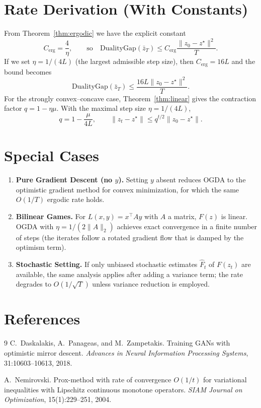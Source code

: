 \documentclass[11pt]{article}
\begin{document}
\section*{Rate Derivation (With Constants)}
From Theorem~\ref{thm:ergodic} we have the explicit constant
\[
C_{\text{erg}}=\frac{4}{\eta},
\qquad
\text{so}\quad
\text{DualityGap}(\bar z_T)\le C_{\text{erg}}\frac{\|z_0-z^{\star}\|^2}{T}.
\]
If we set $\eta=1/(4L)$ (the largest admissible step size), then $C_{\text{erg}}=16L$ and the bound becomes
\[
\text{DualityGap}(\bar z_T)\le \frac{16L\|z_0-z^{\star}\|^2}{T}.
\]
For the strongly convex–concave case, Theorem~\ref{thm:linear} gives the contraction factor $q=1-\eta\mu$. With the maximal step size $\eta=1/(4L)$,
\[
q=1-\frac{\mu}{4L},
\qquad
\|z_t-z^{\star}\|\le q^{t/2}\|z_0-z^{\star}\|.
\]

\section*{Special Cases}
\begin{enumerate}[label=(\alph*)]
\item \textbf{Pure Gradient Descent (no $y$).} Setting $y$ absent reduces OGDA to the optimistic gradient method for convex minimization, for which the same $O(1/T)$ ergodic rate holds.
\item \textbf{Bilinear Games.} For $L(x,y)=x^{\top}Ay$ with $A$ a matrix, $F(z)$ is linear. OGDA with $\eta=1/(2\|A\|_2)$ achieves exact convergence in a finite number of steps (the iterates follow a rotated gradient flow that is damped by the optimism term).
\item \textbf{Stochastic Setting.} If only unbiased stochastic estimates $\hat F_t$ of $F(z_t)$ are available, the same analysis applies after adding a variance term; the rate degrades to $O(1/\sqrt{T})$ unless variance reduction is employed.
\end{enumerate}

\section*{References}
\begin{thebibliography}{9}
C.~Daskalakis, A.~Panageas, and M.~Zampetakis.
\newblock Training GANs with optimistic mirror descent.
\newblock \emph{Advances in Neural Information Processing Systems}, 31:10603--10613, 2018.

A.~Nemirovski.
\newblock Prox-method with rate of convergence $O(1/t)$ for variational inequalities with Lipschitz continuous monotone operators.
\newblock \emph{SIAM Journal on Optimization}, 15(1):229--251, 2004.
\end{thebibliography}
\end{document}

